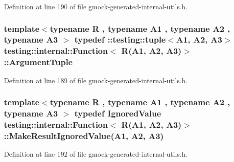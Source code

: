 Definition at line 190 of file gmock-\/generated-\/internal-\/utils.\+h.

\subsubsection[{\texorpdfstring{Argument\+Tuple}{ArgumentTuple}}]{\setlength{\rightskip}{0pt plus 5cm}template$<$typename R , typename A1 , typename A2 , typename A3 $>$ typedef \+::testing\+::tuple$<$A1, A2, A3$>$ {\bf testing\+::internal\+::\+Function}$<$ {\bf R}(A1, A2, A3)$>$\+::{\bf Argument\+Tuple}}\hypertarget{structtesting_1_1internal_1_1_function_3_01_r_07_a1_00_01_a2_00_01_a3_08_4_a6f1e1097947a9e13a4e29099a61de804}{}\label{structtesting_1_1internal_1_1_function_3_01_r_07_a1_00_01_a2_00_01_a3_08_4_a6f1e1097947a9e13a4e29099a61de804}


Definition at line 189 of file gmock-\/generated-\/internal-\/utils.\+h.

\subsubsection[{\texorpdfstring{Make\+Result\+Ignored\+Value}{MakeResultIgnoredValue}}]{\setlength{\rightskip}{0pt plus 5cm}template$<$typename R , typename A1 , typename A2 , typename A3 $>$ typedef {\bf Ignored\+Value} {\bf testing\+::internal\+::\+Function}$<$ {\bf R}(A1, A2, A3)$>$\+::Make\+Result\+Ignored\+Value(A1, A2, A3)}\hypertarget{structtesting_1_1internal_1_1_function_3_01_r_07_a1_00_01_a2_00_01_a3_08_4_abff7468ae8231766e7b396c8a407cb5a}{}\label{structtesting_1_1internal_1_1_function_3_01_r_07_a1_00_01_a2_00_01_a3_08_4_abff7468ae8231766e7b396c8a407cb5a}


Definition at line 192 of file gmock-\/generated-\/internal-\/utils.\+h.


